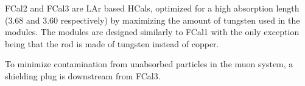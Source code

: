 FCal2 and FCal3 are LAr based HCals, optimized for a high absorption length (3.68 \intlength{} and 3.60 \intlength{} respectively) by maximizing the amount of tungsten used in the modules. The modules are designed similarly to FCal1 with the only exception being that the rod is made of tungsten instead of copper. 

To minimize contamination from unabsorbed particles in the muon system, a shielding plug is downstream from FCal3.
